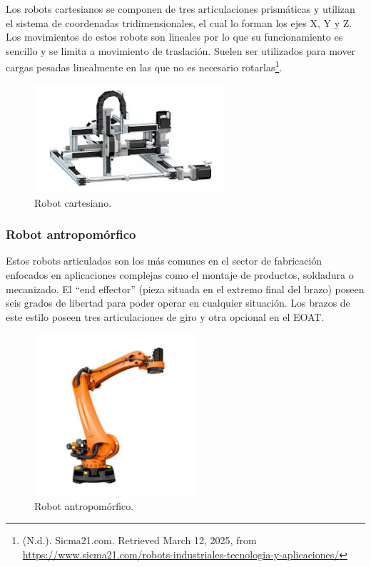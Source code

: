 Los robots cartesianos se componen de tres articulaciones prismáticas y utilizan el sistema de coordenadas tridimensionales, el cual lo forman los ejes X, Y y Z. Los movimientos de estos robots son lineales por lo que su funcionamiento es sencillo y se limita a movimiento de traslación. Suelen ser utilizados para mover cargas pesadas linealmente en las que no es necesario rotarlas\footnote{(N.d.). Sicma21.com. Retrieved March 12, 2025, from  \url{https://www.sicma21.com/robots-industriales-tecnologia-y-aplicaciones/}}. 

\begin{figure} [h!]
  \begin{center}
    \includegraphics[width=7cm]{figs/robot_cartesiano}
  \end{center}
  \caption{\centering Robot cartesiano.}
  \label{fig:robot_cartesiano}
\end{figure} 

\subsubsection{Robot antropomórfico}

Estos robots articulados son los más comunes en el sector de fabricación enfocados en aplicaciones complejas como el montaje de productos, soldadura o mecanizado. El ``end effector'' (pieza situada en el extremo final del brazo) poseen seis grados de libertad para poder operar en cualquier situación. Los brazos de este estilo poseen tres articulaciones de giro y otra opcional en el EOAT.

\begin{figure} [h!]
  \begin{center}
    \includegraphics[width=6cm]{figs/robot_antropomorfico}
  \end{center}
  \caption{\centering Robot antropomórfico.}
  \label{fig:robot_antropomorfico}
\end{figure} 

